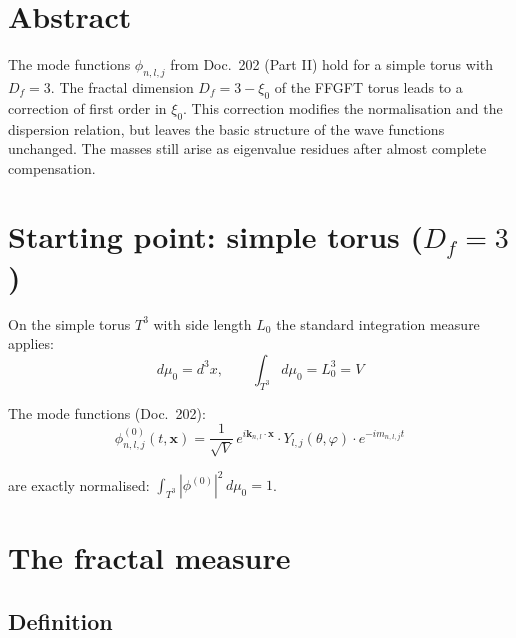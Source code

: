 
\section*{Abstract}

The mode functions $\phi_{n,l,j}$ from Doc.~202 (Part II) hold
for a simple torus with $D_f = 3$. The fractal dimension
$D_f = 3-\xi_0$ of the FFGFT torus leads to a correction of first
order in $\xi_0$. This correction modifies the normalisation and the
dispersion relation, but leaves the basic structure of the wave functions
unchanged. The masses still arise as eigenvalue residues
after almost complete compensation.

\section{Starting point: simple torus (\texorpdfstring{$D_f = 3$}{Df = 3})}

On the simple torus $T^3$ with side length $L_0$ the
standard integration measure applies:
\begin{equation}
  d\mu_0 = d^3x, \qquad
  \int_{T^3} d\mu_0 = L_0^3 = V
\end{equation}

The mode functions (Doc.~202):
\begin{equation}
  \phi_{n,l,j}^{(0)}(t,\mathbf{x})
  = \frac{1}{\sqrt{V}}\,
    e^{i\mathbf{k}_{n,l}\cdot\mathbf{x}} \cdot
    Y_{l,j}(\theta,\varphi) \cdot
    e^{-im_{n,l,j}t}
  \label{eq:phi0}
\end{equation}

are exactly normalised: $\int_{T^3}|\phi^{(0)}|^2\,d\mu_0 = 1$.

\section{The fractal measure}

\subsection{Definition}

